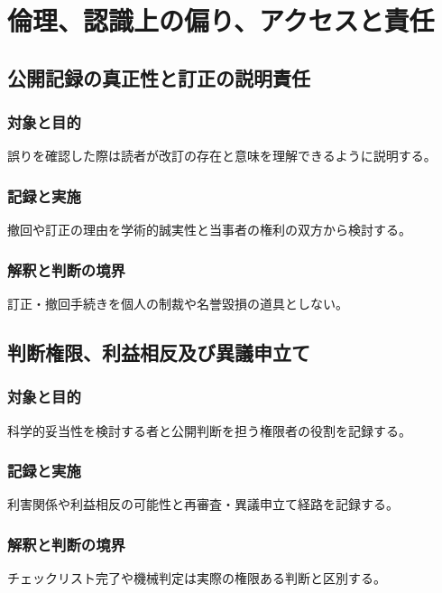\documentclass[a4paper,11pt]{article}
\begin{document}
\section{倫理、認識上の偏り、アクセスと責任}
\subsection{公開記録の真正性と訂正の説明責任}
\subsubsection{対象と目的}
\par 誤りを確認した際は読者が改訂の存在と意味を理解できるように説明する。\par\medskip
\subsubsection{記録と実施}
\par 撤回や訂正の理由を学術的誠実性と当事者の権利の双方から検討する。\par\medskip
\subsubsection{解釈と判断の境界}
\par 訂正・撤回手続きを個人の制裁や名誉毀損の道具としない。\par\medskip
\subsection{判断権限、利益相反及び異議申立て}
\subsubsection{対象と目的}
\par 科学的妥当性を検討する者と公開判断を担う権限者の役割を記録する。\par\medskip
\subsubsection{記録と実施}
\par 利害関係や利益相反の可能性と再審査・異議申立て経路を記録する。\par\medskip
\subsubsection{解釈と判断の境界}
\par チェックリスト完了や機械判定は実際の権限ある判断と区別する。\par\medskip
\end{document}
